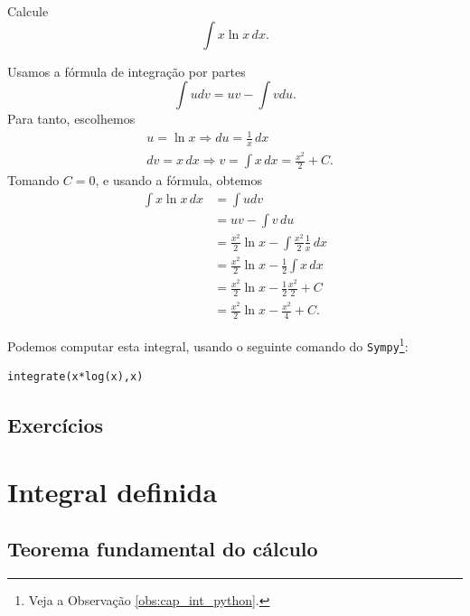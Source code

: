\begin{exeresol}
  Calcule
  \begin{equation}
    \int x\ln x\,dx.
  \end{equation}
\end{exeresol}
\begin{resol}
  Usamos a fórmula de integração por partes
  \begin{equation}
    \int udv = uv - \int vdu.
  \end{equation}
  Para tanto, escolhemos
  \begin{align}
    &u = \ln x \Rightarrow du = \frac{1}{x}\,dx\\
    &dv = x\,dx \Rightarrow v = \int x\,dx = \frac{x^2}{2}+C.
  \end{align}
  Tomando $C=0$, e usando a fórmula, obtemos
  \begin{align}
    \int x\ln x\,dx &= \int udv\\
                    &= uv - \int v\,du\\
                    &= \frac{x^2}{2}\ln x - \int \frac{x^2}{2}\frac{1}{x}\,dx\\
                    &= \frac{x^2}{2}\ln x - \frac{1}{2}\int x\,dx\\
                    &= \frac{x^2}{2}\ln x - \frac{1}{2}\frac{x^2}{2} + C\\
                    &= \frac{x^2}{2}\ln x - \frac{x^2}{4} + C.
  \end{align}

  \ifispython
  Podemos computar esta integral, usando o seguinte comando do \verb+Sympy+\footnote{Veja a Observação \ref{obs:cap_int_python}.}:
\begin{verbatim}
integrate(x*log(x),x)
\end{verbatim}
  \fi
\end{resol}

\emconstrucao

\subsection*{Exercícios}

\emconstrucao

\section{Integral definida}\label{cap_int_intdef}

\emconstrucao

\subsection{Teorema fundamental do cálculo}

